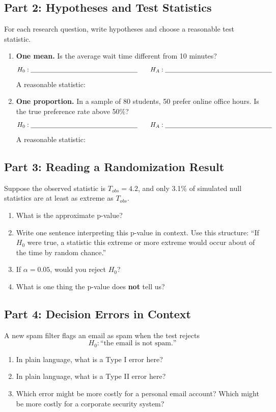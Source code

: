 \documentclass{article}
\newcommand{\blankline}[1]{\underline{\hspace{#1}}}
\begin{document}
\subsection*{Part 2: Hypotheses and Test Statistics}
For each research question, write hypotheses and choose a reasonable test statistic.

\begin{enumerate}[label={\bfseries (\Alph*)},itemsep=1em]
\item \textbf{One mean.} Is the average wait time different from 10 minutes?
\[
H_0: \blankline{2.3in} \qquad H_A: \blankline{2.3in}
\]
A reasonable statistic: \blankline{2.8in}

\item \textbf{One proportion.} In a sample of 80 students, 50 prefer online office hours. Is the true preference rate above 50\%?
\[
H_0: \blankline{2.3in} \qquad H_A: \blankline{2.3in}
\]
A reasonable statistic: \blankline{2.8in}
\end{enumerate}

\subsection*{Part 3: Reading a Randomization Result}
Suppose the observed statistic is $T_{obs}=4.2$, and only 3.1\% of simulated null statistics are at least as extreme as $T_{obs}$.

\begin{enumerate}[label={\bfseries (\Alph*)},itemsep=.8em]
\item What is the approximate p-value? \hfill \blankline{1.5in}
\item Write one sentence interpreting this p-value in context. Use this structure: ``If $H_0$ were true, a statistic this extreme or more extreme would occur about \underline{\hspace{.5in}} of the time by random chance.'' \\[5em]
\item If $\alpha=0.05$, would you reject $H_0$? \hfill \blankline{1.5in}
\item What is one thing the p-value does \textbf{not} tell us? \\[3em]
\end{enumerate}

\subsection*{Part 4: Decision Errors in Context}
A new spam filter flags an email as spam when the test rejects
\[
H_0: \text{``the email is not spam.''}
\]

\begin{enumerate}[label={\bfseries (\Alph*)},itemsep=.8em]
\item In plain language, what is a Type I error here? \\[3em]
\item In plain language, what is a Type II error here? \\[3em]
\item Which error might be more costly for a personal email account? Which might be more costly for a corporate security system? \\[4em]
\end{enumerate}
\end{document}
